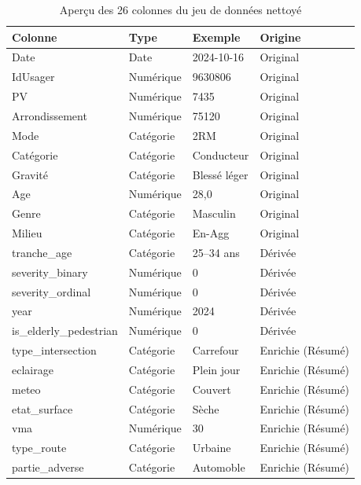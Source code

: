 \documentclass[12pt,a4paper]{article}
\begin{document}
\begin{longtable}{@{}p{3cm} p{3cm} p{3cm} p{3cm}@{}}
\caption{Aperçu des 26 colonnes du jeu de données nettoyé} \\
\toprule
\textbf{Colonne} & \textbf{Type} & \textbf{Exemple} & \textbf{Origine} \\
\midrule
\endhead
Date              & Date     & 2024-10-16    & Original \\
IdUsager          & Numérique & 9630806      & Original \\
PV                & Numérique & 7435         & Original \\
Arrondissement    & Numérique & 75120        & Original \\
Mode              & Catégorie & 2RM          & Original \\
Catégorie         & Catégorie & Conducteur   & Original \\
Gravité           & Catégorie & Blessé léger & Original \\
Age               & Numérique & 28,0         & Original \\
Genre             & Catégorie & Masculin     & Original \\
Milieu            & Catégorie & En-Agg       & Original \\
tranche\_age      & Catégorie & 25--34 ans   & Dérivée \\
severity\_binary  & Numérique & 0            & Dérivée \\
severity\_ordinal & Numérique & 0            & Dérivée \\
year              & Numérique & 2024         & Dérivée \\
is\_elderly\_pedestrian & Numérique & 0    & Dérivée \\
type\_intersection & Catégorie & Carrefour   & Enrichie (Résumé) \\
eclairage         & Catégorie & Plein jour   & Enrichie (Résumé) \\
meteo             & Catégorie & Couvert      & Enrichie (Résumé) \\
etat\_surface     & Catégorie & Sèche        & Enrichie (Résumé) \\
vma               & Numérique & 30           & Enrichie (Résumé) \\
type\_route       & Catégorie & Urbaine      & Enrichie (Résumé) \\
partie\_adverse   & Catégorie & Automoble    & Enrichie (Résumé) \\
\bottomrule
\end{longtable}
\end{document}
